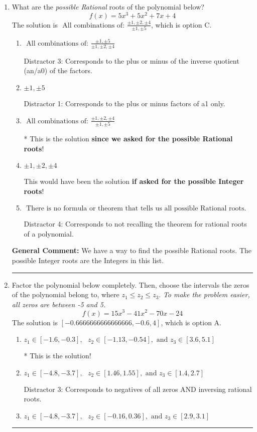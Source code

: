 \documentclass{extbook}[14pt]
\newcommand{\litem}[1]{\item #1

\rule{\textwidth}{0.4pt}}
\begin{document}
\begin{enumerate}\litem{
What are the \textit{possible Rational} roots of the polynomial below?
\[ f(x) = 5x^{3} +5 x^{2} +7 x + 4 \]The solution is \( \text{ All combinations of: }\frac{\pm 1,\pm 2,\pm 4}{\pm 1,\pm 5} \), which is option C.\begin{enumerate}[label=\Alph*.]
\item \( \text{ All combinations of: }\frac{\pm 1,\pm 5}{\pm 1,\pm 2,\pm 4} \)

 Distractor 3: Corresponds to the plus or minus of the inverse quotient (an/a0) of the factors. 
\item \( \pm 1,\pm 5 \)

 Distractor 1: Corresponds to the plus or minus factors of a1 only.
\item \( \text{ All combinations of: }\frac{\pm 1,\pm 2,\pm 4}{\pm 1,\pm 5} \)

* This is the solution \textbf{since we asked for the possible Rational roots}!
\item \( \pm 1,\pm 2,\pm 4 \)

This would have been the solution \textbf{if asked for the possible Integer roots}!
\item \( \text{ There is no formula or theorem that tells us all possible Rational roots.} \)

 Distractor 4: Corresponds to not recalling the theorem for rational roots of a polynomial.
\end{enumerate}

\textbf{General Comment:} We have a way to find the possible Rational roots. The possible Integer roots are the Integers in this list.
}
\litem{
Factor the polynomial below completely. Then, choose the intervals the zeros of the polynomial belong to, where $z_1 \leq z_2 \leq z_3$. \textit{To make the problem easier, all zeros are between -5 and 5.}
\[ f(x) = 15x^{3} -41 x^{2} -70 x -24 \]The solution is \( [-0.6666666666666666, -0.6, 4] \), which is option A.\begin{enumerate}[label=\Alph*.]
\item \( z_1 \in [-1.6, -0.3], \text{   }  z_2 \in [-1.13, -0.54], \text{   and   } z_3 \in [3.6, 5.1] \)

* This is the solution!
\item \( z_1 \in [-4.8, -3.7], \text{   }  z_2 \in [1.46, 1.55], \text{   and   } z_3 \in [1.4, 2.7] \)

 Distractor 3: Corresponds to negatives of all zeros AND inversing rational roots.
\item \( z_1 \in [-4.8, -3.7], \text{   }  z_2 \in [-0.16, 0.36], \text{   and   } z_3 \in [2.9, 3.1] \)


\end{enumerate}}
\end{enumerate}
\end{document}
